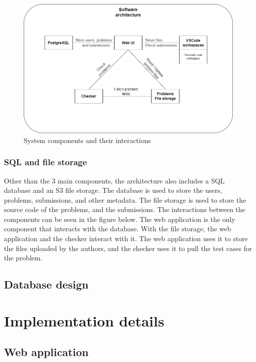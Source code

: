 \documentclass[12pt,a4paper]{report}
\begin{document}
\begin{figure}[h]
	\centering
	\includegraphics[width=\linewidth]{../photos/software-architecture.png}
	\caption{System components and their interactions}
	\label{fig:system-components}
\end{figure}

\subsection{SQL and file storage}
Other than the 3 main components, the architecture also includes a SQL database and an S3 file storage. The database is used to store the users, problems, submissions, and other metadata. The file storage is used to store the source code of the problems, and the submissions. The interactions between the components can be seen in the figure below. The web application is the only component that interacts with the database. With the file storage, the web application and the checker interact with it. The web application uses it to store the files uploaded by the authors, and the checker uses it to pull the test cases for the problem.


\section{Database design}


\chapter{Implementation details}
\section{Web application}
\end{document}
